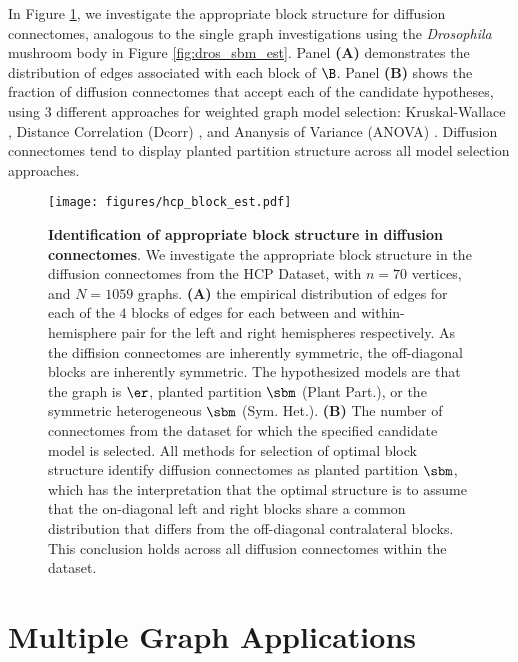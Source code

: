 In Figure \ref{fig:nested_sbm_ts_mri}, we investigate the appropriate block structure for diffusion connectomes, analogous to the single graph investigations using the \textit{Drosophila} mushroom body in Figure \ref{fig:dros_sbm_est}. Panel \textbf{(A)} demonstrates the distribution of edges associated with each block of $\B$. Panel \textbf{(B)} shows the fraction of diffusion connectomes that accept each of the candidate hypotheses, using $3$ different approaches for weighted graph model selection: Kruskal-Wallace  \cite{Kruskal1952-kj}, Distance Correlation (Dcorr) \cite{Szekely2007-mm}, and Ananysis of Variance (ANOVA) \cite{Fisher1925-xm,Scheffe1999-pi}. Diffusion connectomes tend to display planted partition structure across all model selection approaches.

\begin{figure}
    \centering
    \texttt{[image: figures/hcp\_block\_est.pdf]}
    \caption{\textbf{Identification of appropriate block structure in diffusion connectomes}. We investigate the appropriate block structure in the diffusion connectomes from the HCP Dataset, with $n=70$ vertices, and $N=1059$ graphs. \textbf{(A)} the empirical distribution of edges for each of the $4$ blocks of edges for each between and within-hemisphere pair for the left and right hemispheres respectively. As the diffision connectomes are inherently symmetric, the off-diagonal blocks are inherently symmetric. The hypothesized models are that the graph is $\er$, planted partition $\sbm$ (Plant Part.), or the symmetric heterogeneous $\sbm$ (Sym. Het.). \textbf{(B)} The number of connectomes from the dataset for which the specified candidate model is selected. All methods for selection of optimal block structure identify diffusion connectomes as planted partition $\sbm$, which has the interpretation that the optimal structure is to assume that the on-diagonal left and right blocks share a common distribution that differs from the off-diagonal contralateral blocks. This conclusion holds across all diffusion connectomes within the dataset.}
    \label{fig:nested_sbm_ts_mri}
\end{figure}



\section{Multiple Graph Applications}\label{sec:multi_app_appendix}

